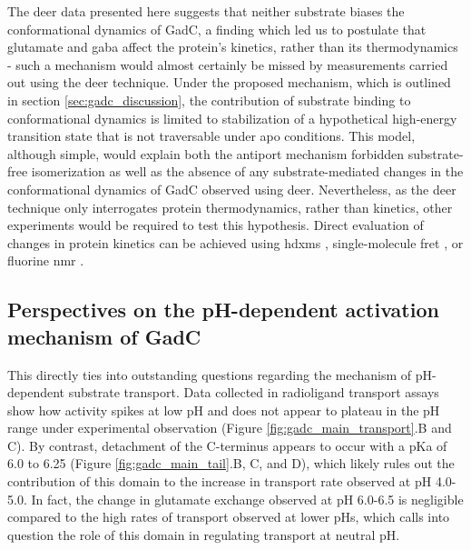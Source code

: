 The \gls{deer} data presented here suggests that neither substrate biases the conformational dynamics of GadC, a finding which led us to postulate that glutamate and \gls{gaba} affect the protein's kinetics, rather than its thermodynamics - such a mechanism would almost certainly be missed by measurements carried out using the \gls{deer} technique. Under the proposed mechanism, which is outlined in section \ref{sec:gadc_discussion}, the contribution of substrate binding to conformational dynamics is limited to stabilization of a hypothetical high-energy transition state that is not traversable under apo conditions. This model, although simple, would explain both the antiport mechanism forbidden substrate-free isomerization as well as the absence of any substrate-mediated changes in the conformational dynamics of GadC observed using \gls{deer}. Nevertheless, as the \gls{deer} technique only interrogates protein thermodynamics, rather than kinetics, other experiments would be required to test this hypothesis. Direct evaluation of changes in protein kinetics can be achieved using \gls{hdxms} \citep*{Oganesyan2018}, single-molecule \gls{fret} \citep*{Schuler2013}, or fluorine \gls{nmr} \citep*{Manglik2015}.

\subsection{Perspectives on the pH-dependent activation mechanism of GadC}

This directly ties into outstanding questions regarding the mechanism of pH-dependent substrate transport. Data collected in radioligand transport assays show how activity spikes at low pH and does not appear to plateau in the pH range under experimental observation (Figure \ref{fig:gadc_main_transport}.B and C). By contrast, detachment of the C-terminus appears to occur with a pKa of 6.0 to 6.25 (Figure \ref{fig:gadc_main_tail}.B, C, and D), which likely rules out the contribution of this domain to the increase in transport rate observed at pH 4.0-5.0. In fact, the change in glutamate exchange observed at pH 6.0-6.5 is negligible compared to the high rates of transport observed at lower pHs, which calls into question the role of this domain in regulating transport at neutral pH.

